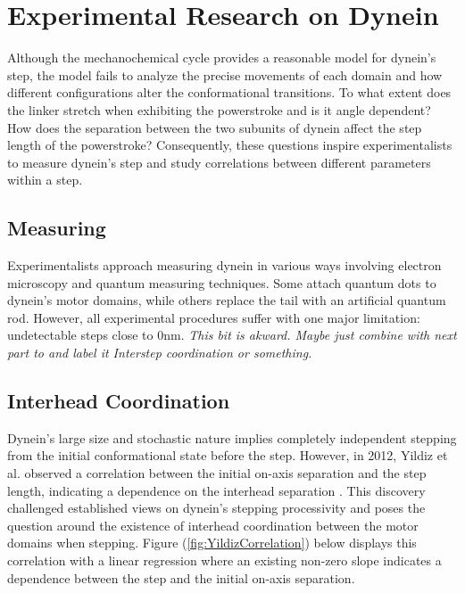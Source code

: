 \section{Experimental Research on Dynein}

Although the mechanochemical cycle provides a reasonable model for dynein's step, the model fails to analyze the precise movements of each domain and how different configurations alter the conformational transitions. To what extent does the linker stretch when exhibiting the powerstroke and is it angle dependent? How does the separation between the two subunits of dynein affect the step length of the powerstroke? Consequently, these questions inspire experimentalists to measure dynein's step and study correlations between different parameters within a step.

\subsection{Measuring}

Experimentalists approach measuring dynein in various ways involving electron microscopy and quantum measuring techniques. Some attach quantum dots to dynein's motor domains, while others replace the tail with an artificial quantum rod. However, all experimental procedures suffer with one major limitation: undetectable steps close to 0nm. \textit{This bit is akward. Maybe just combine with next part to and label it Interstep coordination or something.}


\subsection{Interhead Coordination}

Dynein's large size and stochastic nature implies completely independent stepping from the initial conformational state before the step. However, in 2012, Yildiz et al. observed a correlation between the initial on-axis separation and the step length, indicating a dependence on the interhead separation \cite{Dewitt2012}. This discovery challenged established views on dynein's stepping processivity and poses the question around the existence of interhead coordination between the motor domains when stepping. Figure (\ref{fig:YildizCorrelation}) below displays this correlation with a linear regression where an existing non-zero slope indicates a dependence between the step and the initial on-axis separation.

